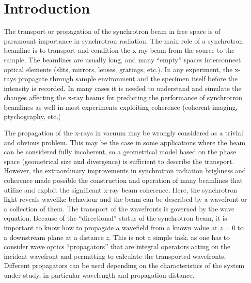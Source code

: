 \documentclass{iucr}              %
\begin{document}
\section{Introduction}
\label{ch:intro}

The transport or propagation of the synchrotron beam in free space is of paramount importance in synchrotron radiation. 
The main role of a synchrotron beamline is to transport and condition the x-ray beam from the source to the sample. The beamlines are usually long, and many ``empty'' spaces interconnect optical elements (slits, mirrors, lenses, gratings, etc.). In any experiment, the x-rays propagate through sample environment and the specimen itself before the intensity is recorded.  In many cases it is needed to understand and simulate the changes affecting the x-ray beams for predicting the performance of synchrotron beamlines as well in most experiments exploiting coherence (coherent imaging, ptychography, etc.)

The propagation of the x-rays in vacuum may be wrongly considered as a trivial and obvious problem. This may be the case in some applications where the beam can be considered fully incoherent, so a geometrical model based on the phase space (geometrical size and divergence) is sufficient to describe the transport.  
However, the extraordinary improvements in synchrotron radiation brighness and coherence made possible the construction and operation of many beamlines that utilize and exploit the significant x-ray beam coherence. Here, the synchrotron light reveals wavelike behaviour and the beam can be described by a wavefront or a collection of them. The transport of the wavefronts is governed by the wave equation. Because of the ``directional'' status of the synchrotron beam, it is important to know how to propagate a wavefield from a known value at $z=0$ to a downstream plane at a distance $z$. This is not a simple task, as one has to consider wave optics ``propagators'' that are integral operators acting on the incident wavefront and permitting to calculate the transported wavefronts. Different propagators can be used depending on the characteristics of the system under study, in particular wavelength and propagation distance. 
\end{document}
